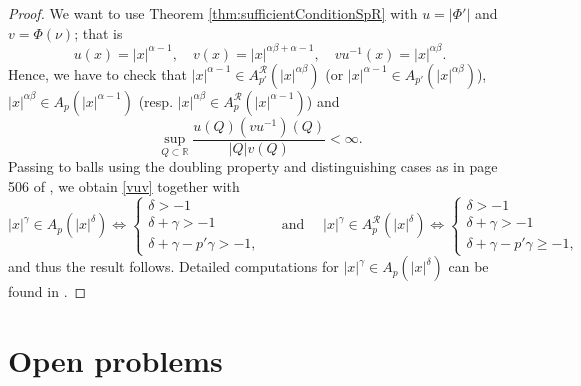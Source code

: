 \documentclass[12pt]{amsart}
\newcommand{\R}{\mathbb{R}}
\theoremstyle{plain}
\theoremstyle{definition}
\numberwithin{equation}{section}
\begin{document}
\begin{proof}  We want to use Theorem \ref{thm:sufficientConditionSpR} with $u=|\Phi'|$ and $v=\Phi(\nu)$; that is
\[
u(x)
=
|x|^{\alpha-1},
\quad 
v(x)
=
|x|^{\alpha\beta+\alpha-1},
\quad 
vu^{-1}(x)
=
|x|^{\alpha\beta}.
\]
Hence, we have to check that 
$|x|^{\alpha-1}\in A_{p'}^{\mathcal{R}}(|x|^{\alpha\beta})$ (or  $|x|^{\alpha-1}\in A_{p'}(|x|^{\alpha\beta})$), $|x|^{\alpha\beta}
\in A_p(|x|^{\alpha-1})$ (resp. $|x|^{\alpha\beta}
\in A_p^{\mathcal{R}}(|x|^{\alpha-1})$) and 
\begin{equation}\label{vuv}
\sup_{Q\subset \R}\frac{u(Q)(vu^{-1})(Q)}{|Q|v(Q)}<\infty. 
\end{equation}
Passing to balls using the doubling property and distinguishing cases as in page 506 of \cite{grafakosClassical}, we obtain \eqref{vuv} together with 
\begin{equation*}
|x|^{\gamma}\in A_p(|x|^{\delta})
\iff
\begin{cases}
    \delta>-1\\
    \delta+\gamma>-1\\
    \delta+\gamma-p'\gamma>-1,
\end{cases}
\quad\mbox{ and }\quad
|x|^{\gamma}\in A_p^{\mathcal{R}}(|x|^{\delta})
\iff
\begin{cases}
    \delta>-1\\
    \delta+\gamma>-1\\
    \delta+\gamma-p'\gamma\geq-1,
\end{cases}
\end{equation*}
and thus the result follows. Detailed computations for $|x|^{\gamma}\in A_p(|x|^{\delta})$ can be found in \cite{WickEtAl_Weights}.
\end{proof}
























\section{Open problems}
\end{document}
